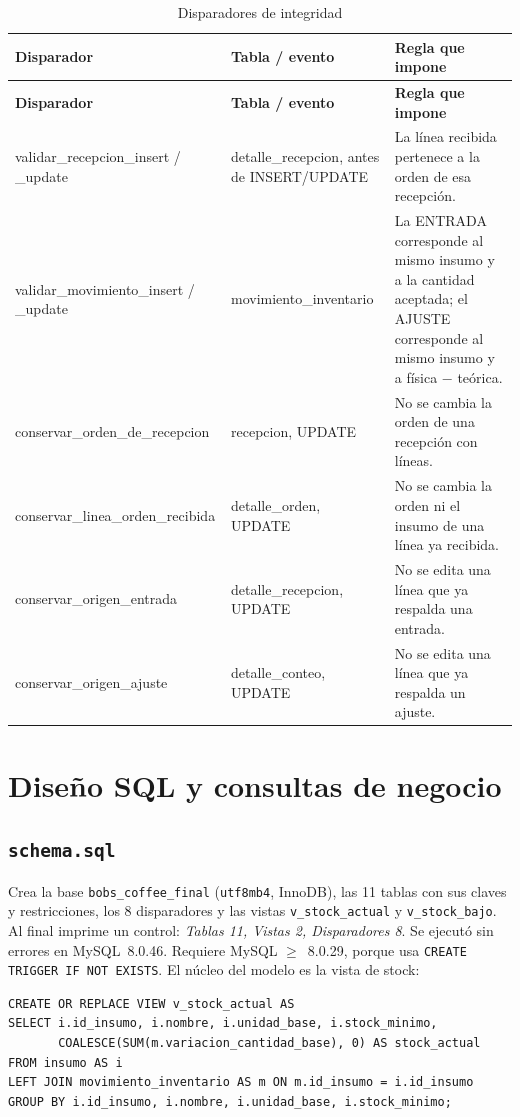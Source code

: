 \documentclass[11pt,letterpaper]{article}
\newcommand{\tablasize}{\footnotesize}
\begin{document}
{\tablasize
\begin{longtable}{>{\raggedright\arraybackslash}p{4.6cm}>{\raggedright\arraybackslash}p{3.1cm}>{\raggedright\arraybackslash}p{6.9cm}}
\caption{Disparadores de integridad}\label{tab:triggers}\\
\toprule \textbf{Disparador} & \textbf{Tabla / evento} & \textbf{Regla que impone} \\ \midrule \endfirsthead
\toprule \textbf{Disparador} & \textbf{Tabla / evento} & \textbf{Regla que impone} \\ \midrule \endhead
validar\_recepcion\_insert / \_update & detalle\_recepcion, antes de INSERT/UPDATE & La línea recibida pertenece a la orden de esa recepción. \\
validar\_movimiento\_insert / \_update & movimiento\_inventario & La ENTRADA corresponde al mismo insumo y a la cantidad aceptada; el AJUSTE corresponde al mismo insumo y a física $-$ teórica. \\
conservar\_orden\_de\_recepcion & recepcion, UPDATE & No se cambia la orden de una recepción con líneas. \\
conservar\_linea\_orden\_recibida & detalle\_orden, UPDATE & No se cambia la orden ni el insumo de una línea ya recibida. \\
conservar\_origen\_entrada & detalle\_recepcion, UPDATE & No se edita una línea que ya respalda una entrada. \\
conservar\_origen\_ajuste & detalle\_conteo, UPDATE & No se edita una línea que ya respalda un ajuste. \\
\bottomrule
\end{longtable}
}

\newpage
\section{Diseño SQL y consultas de negocio}
\label{sec:sql}

\subsection{\texttt{schema.sql}}
Crea la base \texttt{bobs\_coffee\_final} (\texttt{utf8mb4}, InnoDB), las 11 tablas con sus claves y restricciones, los 8 disparadores y las vistas \texttt{v\_stock\_actual} y \texttt{v\_stock\_bajo}. Al final imprime un control: \emph{Tablas 11, Vistas 2, Disparadores 8}. Se ejecutó sin errores en MySQL~8.0.46. Requiere MySQL $\geq$~8.0.29, porque usa \texttt{CREATE TRIGGER IF NOT EXISTS}. El núcleo del modelo es la vista de stock:
\begin{lstlisting}
CREATE OR REPLACE VIEW v_stock_actual AS
SELECT i.id_insumo, i.nombre, i.unidad_base, i.stock_minimo,
       COALESCE(SUM(m.variacion_cantidad_base), 0) AS stock_actual
FROM insumo AS i
LEFT JOIN movimiento_inventario AS m ON m.id_insumo = i.id_insumo
GROUP BY i.id_insumo, i.nombre, i.unidad_base, i.stock_minimo;
\end{lstlisting}
\end{document}
